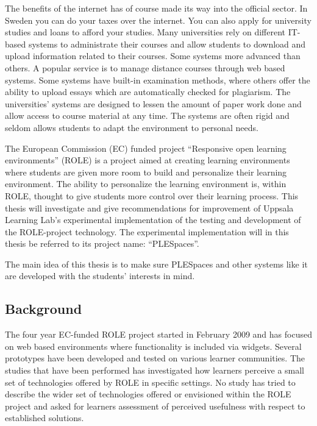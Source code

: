 The benefits of the internet has of course made its way into the official sector. In Sweden you can do your taxes over the internet. You can also apply for university studies and loans  to afford your studies. Many universities rely on different IT-based systems to administrate their courses and allow students to download and upload information related to their courses. Some systems more advanced than others.  A popular service is to manage distance courses through web based systems. Some systems have built-in examination methods, where others offer the ability to upload essays which are automatically checked for plagiarism. The universities' systems are designed to lessen the amount of paper work done and allow access to course material at any time. The systems are often rigid and seldom allows students to adapt the environment to personal needs.

The European Commission (EC) funded project “Responsive open learning environments” (ROLE) is a project aimed at creating learning environments where students are given more room to build and personalize their learning environment. The ability to personalize the learning environment is, within ROLE, thought to give students more control over their learning process. This thesis will investigate and give recommendations for improvement of Uppsala Learning Lab's experimental implementation of the testing and development of the ROLE-project technology. The experimental implementation will in this thesis be referred to its project name: “PLESpaces”.

The main idea of this thesis is to make sure PLESpaces and other systems like it are developed with the students' interests in mind.

\subsection {Background}
The four year EC-funded ROLE project started in February 2009 and has focused on web based environments where functionality is included via widgets. Several prototypes have been developed and tested on various learner communities. The studies that have been performed has investigated how learners perceive a small set of technologies offered by ROLE in specific settings. No study has tried to describe the wider set of technologies offered or envisioned within the ROLE project and asked for learners assessment of perceived usefulness with respect to established solutions.

